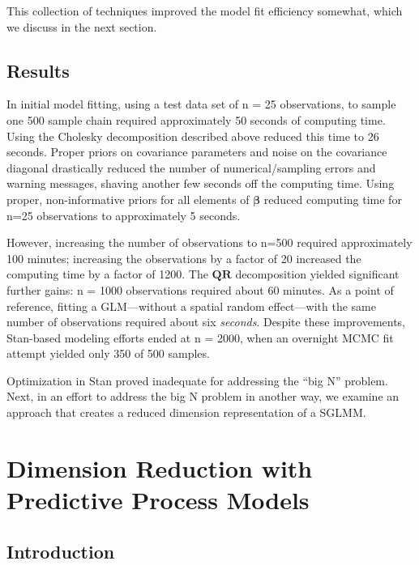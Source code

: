 This collection of techniques improved the model fit efficiency somewhat, which we discuss in the next section.

\subsection{Results}

In initial model fitting, using a test data set of n = 25 observations, to sample one 500 sample chain required approximately 50 seconds of computing time. Using the Cholesky decomposition described above reduced this time to 26 seconds. Proper priors on covariance parameters and noise on the covariance diagonal drastically reduced the number of numerical/sampling errors and warning messages, shaving another few seconds off the computing time. Using proper, non-informative priors for all elements of $\pmb{\beta}$ reduced computing time for n=25 observations to approximately 5 seconds. 

However, increasing the number of observations to n=500 required approximately 100 minutes; increasing the observations by a factor of 20 increased the computing time by a factor of 1200. The $\pmb{QR}$ decomposition yielded significant further gains: n = 1000 observations required about 60 minutes. As a point of reference, fitting a GLM---without a spatial random effect---with the same number of observations required about six {\it seconds}. Despite these improvements, Stan-based modeling efforts ended at n = 2000, when an overnight MCMC fit attempt yielded only 350 of 500 samples.

Optimization in Stan proved inadequate for addressing the ``big N'' problem. Next, in an effort to address the big N problem in another way, we examine an approach that creates a reduced dimension representation of a SGLMM. 

\section{Dimension Reduction with Predictive Process Models} \label{ppm} %

\subsection{Introduction}

